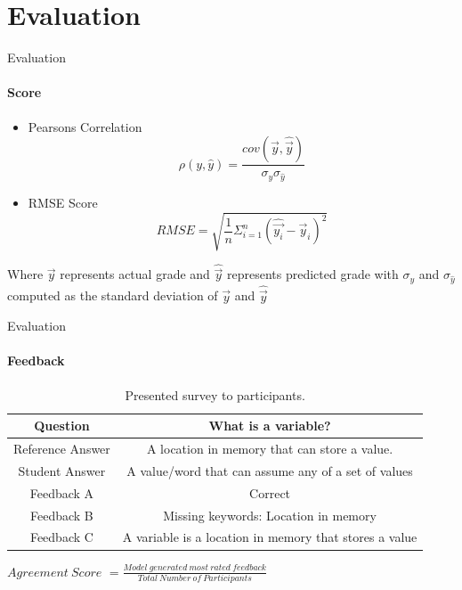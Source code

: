 \documentclass[aspectratio=169]{beamer}
\begin{document}
\section{Evaluation}
\begin{frame}{Evaluation}
	\framesubtitle{Score}
	\begin{itemize}
		\item Pearsons Correlation
		\begin{equation}
		\label{equation:pearson correlation}
		\rho(y,\hat{y}) = \frac{cov(\vec{y},\hat{\vec{y}})}{\sigma_y \sigma_{\hat{y}}}
		\end{equation}
		\item RMSE Score
		\begin{equation}
		\label{equation:Root mean square error}
		RMSE = \sqrt{\frac{1}{n}\Sigma_{i=1}^n(\hat{\vec{y_i}} - \vec{y}_i)^2}
		\end{equation}
	\end{itemize}
Where $\vec{y}$ represents actual grade and $\hat{\vec{y}}$ represents predicted grade with $\sigma_y$ and $\sigma_{\hat{y}}$ computed as the standard deviation of $\vec{y}$ and $\hat{\vec{y}}$
\end{frame}
\begin{frame}{Evaluation}
\framesubtitle{Feedback}
\begin{table}
	\begin{center}
		\begin{tabular}{ |c|c| }
			\hline
			Question & What is a variable?  
			\\ \hline 
			Reference Answer & A location in memory that can store a value.
			\\ \hline
			Student Answer & A value/word that can assume any of a set of values
			\\ \hline
			Feedback A & Correct
			\\ \hline
			Feedback B & Missing keywords: Location in memory
			\\ \hline
			Feedback C & A variable is a location in memory that stores a value
			\\ \hline
		\end{tabular}
		\caption{Presented survey to participants.}
		\label{table:language models}
	\end{center}
\end{table}
\centering
$Agreement\ Score$ $= \frac{Model\ generated\ most\ rated\ feedback}{Total\ Number\ of\ Participants}$
\end{frame}
\end{document}
